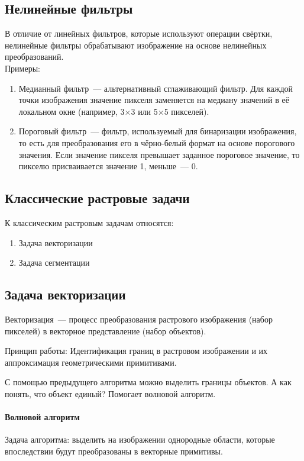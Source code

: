 \subsection{Нелинейные фильтры}
В отличие от линейных фильтров, которые используют операции свёртки, нелинейные фильтры обрабатывают изображение на основе нелинейных преобразований.
\\

Примеры:
\begin{enumerate}
    \item Медианный фильтр~--- альтернативный сглаживающий фильтр. Для каждой точки изображения значение пикселя заменяется на медиану значений в её локальном окне (например, 3×3 или 5×5 пикселей).
    \item Пороговый фильтр~--- фильтр, используемый для бинаризации изображения, то есть для преобразования его в чёрно-белый формат на основе порогового значения. Если значение пикселя превышает заданное пороговое значение, то пикселю присваивается значение 1, меньше~--- 0.
\end{enumerate}

\subsection{Классические растровые задачи}
К классическим растровым задачам относятся:
\begin{enumerate}
    \item Задача векторизации
    \item Задача сегментации
\end{enumerate}

\subsection{Задача векторизации}
Векторизация~--- процесс преобразования растрового изображения (набор пикселей) в векторное представление (набор объектов).

Принцип работы: Идентификация границ в растровом изображении и их аппроксимация геометрическими примитивами.

С  помощью предыдущего алгоритма можно выделить границы объектов. А как понять, что объект единый? Помогает волновой алгоритм.

\paragraph{Волновой алгоритм}
Задача алгоритма: выделить на изображении однородные области, которые впоследствии будут преобразованы в векторные примитивы.
\\

